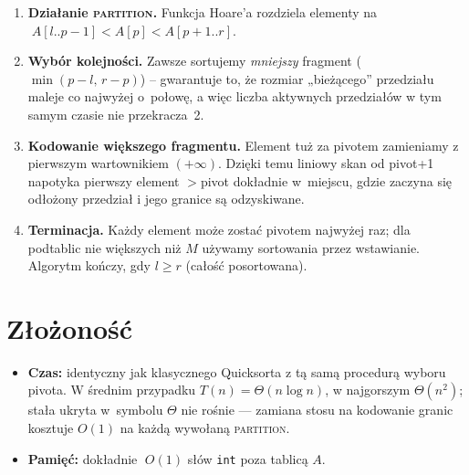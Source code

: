 \documentclass[11pt,a4paper]{article}
\begin{document}
\begin{enumerate}
\item \textbf{Działanie \textsc{partition}.}
      Funkcja Hoare’a rozdziela elementy na
      \(\;A[l..p-1]\!<\!A[p]\!<\!A[p+1..r]\).
\item \textbf{Wybór kolejności.}
      Zawsze sortujemy \emph{mniejszy} fragment
      (\(\min(p-l,\,r-p)\)) – gwarantuje to,
      że rozmiar „bieżącego” przedziału
      maleje co najwyżej o~połowę,
      a więc liczba aktywnych przedziałów
      w tym samym czasie nie przekracza~2.
\item \textbf{Kodowanie większego fragmentu.}
      Element tuż za pivotem zamieniamy
      z pierwszym wartownikiem $(+\infty)$.
      Dzięki temu liniowy skan od pivot+1
      napotyka pierwszy element $>\!$pivot
      dokładnie w~miejscu, gdzie zaczyna się
      odłożony przedział i jego granice są odzyskiwane.
\item \textbf{Terminacja.}
      Każdy element może zostać pivotem
      najwyżej raz; dla podtablic
      nie większych niż $M$
      używamy sortowania przez wstawianie.
      Algorytm kończy, gdy \(l\ge r\)
      (całość posortowana).
\end{enumerate}

\section*{Złożoność}

\begin{itemize}
\item \textbf{Czas:}
      identyczny jak klasycznego Quick\-sorta
      z tą samą procedurą wyboru pivota.
      W średnim przypadku
      \(
        T(n)=\Theta(n\log n)
      \),
      w najgorszym \(\Theta(n^2)\);
      stała ukryta w~symbolu $\Theta$
      nie rośnie — zamiana stosu
      na kodowanie granic kosztuje $O(1)$
      na każdą wywołaną \textsc{partition}.
\item \textbf{Pamięć:}
      dokładnie \(\;O(1)\) słów \texttt{int}
      poza tablicą $A$.
\end{itemize}
\end{document}
